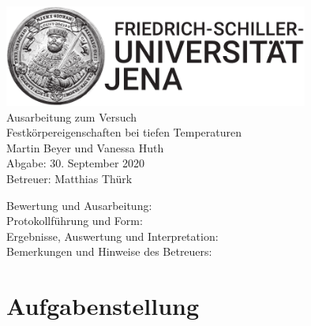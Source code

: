 \documentclass[parskip=half, a4paper,twoside,final]{article}
\begin{document}
\setlength{\marginparsep}{2em}
\renewcommand{\theequation}{\arabic{section}.\arabic{equation}}
\renewcommand{\thefigure}{\arabic{section}.\arabic{figure}}
\renewcommand{\thetable}{\arabic{section}.\arabic{table}}

\begin{center}
\thispagestyle{empty}
  \includegraphics[width=0.75\textwidth]{../UniJena_BildWortMarke_black.pdf}\\[4em]
  \Large
  Ausarbeitung zum Versuch\\[2em]
  \Huge
  Festkörpereigenschaften bei tiefen Temperaturen\\
  \vspace{2cm}
  \Large
  Martin Beyer und Vanessa Huth\\[2em]
  Abgabe: 30. September 2020\\[2em]
  Betreuer: Matthias Thürk\\[5em]
  \begin{flushleft}
  	Bewertung und Ausarbeitung:\\[2em]
		Protokollführung und Form:\\[1em]
		Ergebnisse, Auswertung und Interpretation:\\[1em]
		Bemerkungen und Hinweise des Betreuers:
  \end{flushleft}
\end{center}
\clearpage

\pagestyle{fancy}
\renewcommand{\headrulewidth}{0pt}
\renewcommand{\footrulewidth}{0.5pt}
\renewcommand{\sectionmark}[1]{\markright{#1}}
\fancyhead[RE,LO]{\rightmark}
\fancyfoot[LE,RO]{\bfseries\thepage}
\renewcommand{\headrulewidth}{0.5pt}
\renewcommand{\footrulewidth}{0.5pt}

\setcounter{equation}{0}
\setcounter{figure}{0}

\tableofcontents
\newpage
\section{Aufgabenstellung} \label{sec:Aufgabenstellung}
\end{document}
